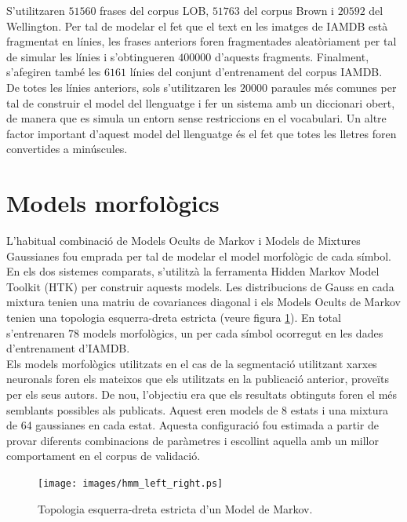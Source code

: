 S'utilitzaren $51560$ frases del corpus LOB, $51763$ del corpus Brown i $20592$ del Wellington. Per tal de modelar el fet que el text en les imatges de IAMDB està fragmentat en línies, les frases anteriors foren fragmentades aleatòriament per tal de simular les línies i s'obtingueren $400000$ d'aquests fragments. Finalment, s'afegiren també les $6161$ línies del conjunt d'entrenament del corpus IAMDB.\\

De totes les línies anteriors, sols s'utilitzaren les $20000$ paraules més comunes per tal de construir el model del llenguatge i fer un sistema amb un diccionari obert, de manera que es simula un entorn sense restriccions en el vocabulari. Un altre factor important d'aquest model del llenguatge és el fet que totes les lletres foren convertides a minúscules.

\section{Models morfològics}
L'habitual combinació de Models Ocults de Markov i Models de Mixtures Gaussianes fou emprada per tal de modelar el model morfològic de cada símbol. En els dos sistemes comparats, s'utilitzà la ferramenta Hidden Markov Model Toolkit (HTK) \cite{young1993htk} per construir aquests models. Les distribucions de Gauss en cada mixtura tenien una matriu de covariances diagonal i els Models Ocults de Markov tenien una topologia esquerra-dreta estricta (veure figura \ref{fig:hmm_left_right}). En total s'entrenaren 78 models morfològics, un per cada símbol ocorregut en les dades d'entrenament d'IAMDB.\\

Els models morfològics utilitzats en el cas de la segmentació utilitzant xarxes neuronals foren els mateixos que els utilitzats en la publicació anterior, proveïts per els seus autors. De nou, l'objectiu era que els resultats obtinguts foren el més semblants possibles als publicats. Aquest eren models de 8 estats i una mixtura de 64 gaussianes en cada estat. Aquesta configuració fou estimada a partir de provar diferents combinacions de paràmetres i escollint aquella amb un millor comportament en el corpus de validació.\\

\begin{figure}
\centering
\texttt{[image: images/hmm\_left\_right.ps]}
\caption{Topologia esquerra-dreta estricta d'un Model de Markov.}\label{fig:hmm_left_right}
\end{figure}

